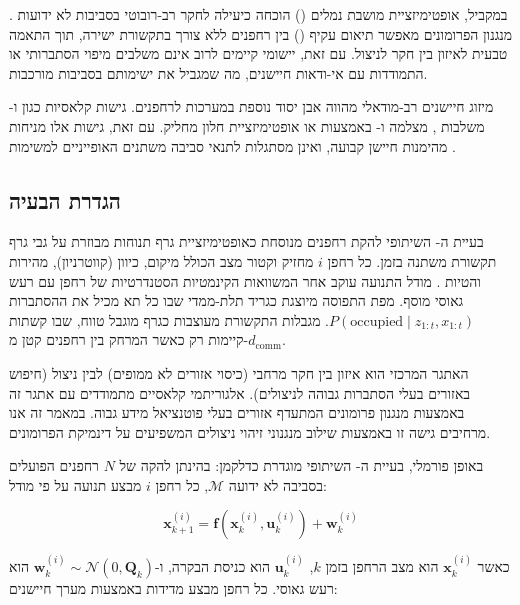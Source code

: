 במקביל, אופטימיזציית מושבת נמלים () הוכחה כיעילה לחקר רב-רובוטי בסביבות לא ידועות \cite{Schroder2007ACO}. מנגנון הפרומונים מאפשר תיאום עקיף () בין רחפנים ללא צורך בתקשורת ישירה, תוך התאמה טבעית לאיזון בין חקר לניצול. עם זאת, יישומי  קיימים לרוב אינם משלבים מיפוי הסתברותי או התמודדות עם אי-ודאות חיישנים, מה שמגביל את ישימותם בסביבות  מורכבות.

מיזוג חיישנים רב-מודאלי מהווה אבן יסוד נוספת במערכות  לרחפנים. גישות קלאסיות כגון  \cite{Qin2018VINSMono} ו- \cite{Zhang2014LOAM} משלבות , מצלמה ו- באמצעות  או אופטימיזציית חלון מחליק. עם זאת, גישות אלו מניחות מהימנות חיישן קבועה, ואינן מסתגלות לתנאי סביבה משתנים האופייניים למשימות .

\subsection{הגדרת הבעיה}
\label{sec:problem_statement}

בעיית ה- השיתופי להקת רחפנים מנוסחת כאופטימיזציית גרף תנוחות מבוזרת על גבי גרף תקשורת משתנה בזמן. כל רחפן $i$ מחזיק וקטור מצב הכולל מיקום, כיוון (קווטרניון), מהירות והטיות . מודל התנועה עוקב אחר המשוואות הקינמטיות הסטנדרטיות של רחפן עם רעש גאוסי מוסף. מפת התפוסה מיוצגת כגריד תלת-ממדי שבו כל תא מכיל את ההסתברות $P(\text{occupied} \mid z_{1:t}, x_{1:t})$. מגבלות התקשורת מעוצבות כגרף מוגבל טווח, שבו קשתות קיימות רק כאשר המרחק בין רחפנים קטן מ-$d_{\text{comm}}$.

האתגר המרכזי הוא איזון בין חקר מרחבי (כיסוי אזורים לא ממופים) לבין ניצול (חיפוש באזורים בעלי הסתברות גבוהה לניצולים). אלגוריתמי  קלאסיים \cite{Dorigo2004ACO} מתמודדים עם אתגר זה באמצעות מנגנון פרומונים המתעדף אזורים בעלי פוטנציאל מידע גבוה. במאמר זה אנו מרחיבים גישה זו באמצעות שילוב מנגנוני זיהוי ניצולים המשפיעים על דינמיקת הפרומונים.

באופן פורמלי, בעיית ה- השיתופי מוגדרת כדלקמן: בהינתן להקה של $N$ רחפנים הפועלים בסביבה לא ידועה $\mathcal{M}$, כל רחפן $i$ מבצע תנועה על פי מודל:

\begin{equation}
\mathbf{x}_{k+1}^{(i)} = \mathbf{f}(\mathbf{x}_{k}^{(i)}, \mathbf{u}_{k}^{(i)}) + \mathbf{w}_{k}^{(i)}
\label{eq:motion_model}
\end{equation}

כאשר $\mathbf{x}_{k}^{(i)}$ הוא מצב הרחפן בזמן $k$, $\mathbf{u}_{k}^{(i)}$ הוא כניסת הבקרה, ו-$\mathbf{w}_{k}^{(i)} \sim \mathcal{N}(0, \mathbf{Q}_{k})$ הוא רעש גאוסי. כל רחפן מבצע מדידות באמצעות מערך חיישנים:

